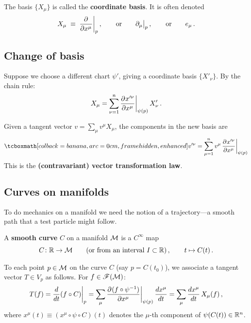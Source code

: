 The basis $\{X_\mu\}$ is called the \textbf{coordinate basis}.
It is often denoted
\begin{equation}\label{eq:coord-basis-notation}
  X_\mu \;\equiv\; \frac{\partial^{} }{\partial {x^\mu}^{}}\bigg|_p\,,
  \qquad\text{or}\qquad
  \partial_\mu\big|_p\,,
  \qquad\text{or}\qquad
  e_\mu\,.
\end{equation}




\subsection{Change of basis}\label{sec:change-basis}

Suppose we choose a different chart $\psi'$, giving a coordinate
basis $\{X'_\nu\}$.  By the chain rule:
\begin{equation}\label{eq:change-basis}
  X_\mu = \sum_{\nu=1}^{n}
    \frac{\partial^{} x'^\nu}{\partial {x^\mu}^{}}\bigg|_{\psi(p)}\, X'_\nu\,.
\end{equation}

Given a tangent vector $v = \sum_\mu v^\mu X_\mu$, the components in
the new basis are
\begin{equation}\label{eq:vector-transform}
  \eqbox{v'^\nu = \sum_{\mu=1}^{n} v^\mu\,
    \pd{x'^\nu}{x^\mu}\bigg|_{\psi(p)}}
\end{equation}
This is the \textbf{(contravariant) vector transformation law}.

\subsection{Curves on manifolds}\label{sec:curves}

To do mechanics on a manifold we need the notion of a trajectory---a
smooth path that a test particle might follow.

\begin{definition}\label{def:smooth-curve}
  A \textbf{smooth curve} $C$ on a manifold $\mathcal{M}$ is a $C^\infty$
  map
  \[
    C\colon \mathbb{R} \to \mathcal{M}
    \qquad(\text{or from an interval } I\subset\mathbb{R})\,,
    \qquad t\mapsto C(t)\,.
  \]
\end{definition}



To each point $p\in\mathcal{M}$ on the curve $C$ (say $p = C(t_0)$),
we associate a tangent vector $T\in V_p$ as follows.
For $f\in\mathscr{F}(\mathcal{M})$:
\begin{equation}\label{eq:tangent-from-curve}
  T(f) = \frac{d }{d t}(f\circ C)\bigg|_{p}
    = \sum_{\mu} \frac{\partial^{} (f\circ\psi^{-1})}{\partial {x^\mu}^{}}\bigg|_{\psi(p)}
      \,\frac{d x^\mu}{d t}
    = \sum_{\mu} \frac{d x^\mu}{d t}\, X_\mu(f)\,,
\end{equation}
where $x^\mu(t) \equiv (x^\mu\circ\psi\circ C)(t)$ denotes the
$\mu$-th component of $\psi(C(t))\in\mathbb{R}^{n}$.

